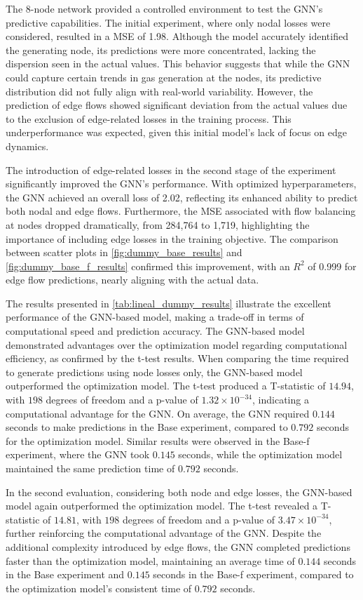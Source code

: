 The 8-node network provided a controlled environment to test the GNN's predictive capabilities. The initial experiment, where only nodal losses were considered, resulted in a MSE of 1.98. Although the model accurately identified the generating node, its predictions were more concentrated, lacking the dispersion seen in the actual values. This behavior suggests that while the GNN could capture certain trends in gas generation at the nodes, its predictive distribution did not fully align with real-world variability. However, the prediction of edge flows showed significant deviation from the actual values due to the exclusion of edge-related losses in the training process. This underperformance was expected, given this initial model's lack of focus on edge dynamics.


The introduction of edge-related losses in the second stage of the experiment significantly improved the GNN's performance. With optimized hyperparameters, the GNN achieved an overall loss of 2.02, reflecting its enhanced ability to predict both nodal and edge flows. Furthermore, the MSE associated with flow balancing at nodes dropped dramatically, from 284,764 to 1,719, highlighting the importance of including edge losses in the training objective. The comparison between scatter plots in \cref{fig:dummy_base_results} and \cref{fig:dummy_base_f_results} confirmed this improvement, with an $R^2$ of 0.999 for edge flow predictions, nearly aligning with the actual data.



 The results presented in \cref{tab:lineal_dummy_results} illustrate the excellent performance of the GNN-based model, making a trade-off in terms of computational speed and prediction accuracy. The GNN-based model demonstrated advantages over the optimization model regarding computational efficiency, as confirmed by the t-test results. When comparing the time required to generate predictions using node losses only, the GNN-based model outperformed the optimization model. The t-test produced a T-statistic of $14.94$, with $198$ degrees of freedom and a p-value of $1.32 \times 10^{-34}$, indicating a computational advantage for the GNN. On average, the GNN required $0.144$ seconds to make predictions in the Base experiment, compared to $0.792$ seconds for the optimization model. Similar results were observed in the Base-f experiment, where the GNN took $0.145$ seconds, while the optimization model maintained the same prediction time of $0.792$ seconds.

In the second evaluation, considering both node and edge losses, the GNN-based model again outperformed the optimization model. The t-test revealed a T-statistic of $14.81$, with $198$ degrees of freedom and a p-value of $3.47 \times 10^{-34}$, further reinforcing the computational advantage of the GNN. Despite the additional complexity introduced by edge flows, the GNN completed predictions faster than the optimization model, maintaining an average time of $0.144$ seconds in the Base experiment and $0.145$ seconds in the Base-f experiment, compared to the optimization model's consistent time of $0.792$ seconds.




